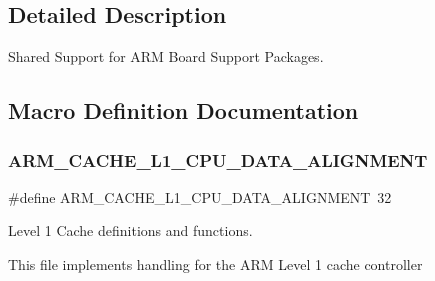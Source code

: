 \subsection{Detailed Description}
Shared Support for A\+RM Board Support Packages. 



\subsection{Macro Definition Documentation}
\mbox{\label{group__RTEMSBSPsARMShared_gaca3a3025c199b251e7278a8987c3aab1}} 
\subsubsection{\texorpdfstring{ARM\_CACHE\_L1\_CPU\_DATA\_ALIGNMENT}{ARM\_CACHE\_L1\_CPU\_DATA\_ALIGNMENT}}
{\footnotesize\ttfamily \#define A\+R\+M\+\_\+\+C\+A\+C\+H\+E\+\_\+\+L1\+\_\+\+C\+P\+U\+\_\+\+D\+A\+T\+A\+\_\+\+A\+L\+I\+G\+N\+M\+E\+NT~32}



Level 1 Cache definitions and functions. 

This file implements handling for the A\+RM Level 1 cache controller 